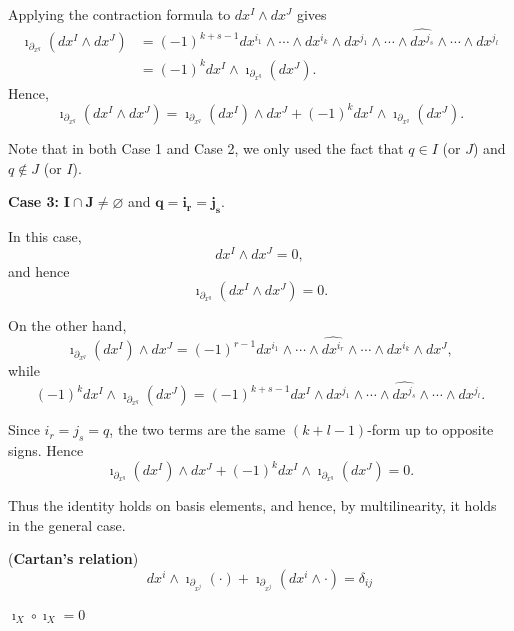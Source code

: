 {Applying the contraction formula to $dx^I\wedge dx^J$ gives
\[
\begin{aligned}
\imath_{\partial_{x^q}}(dx^I\wedge dx^J)
&=
(-1)^{k+s-1}
dx^{i_1}\wedge\cdots\wedge dx^{i_k}
\wedge
dx^{j_1}\wedge\cdots\wedge
\widehat{dx^{j_s}}\wedge\cdots\wedge dx^{j_l}
\\
&=
(-1)^k dx^I\wedge
\imath_{\partial_{x^q}}(dx^J).
\end{aligned}
\]
Hence,
\[
\imath_{\partial_{x^q}}(dx^I\wedge dx^J)
=
\imath_{\partial_{x^q}}(dx^I)\wedge dx^J
+
(-1)^k dx^I\wedge
\imath_{\partial_{x^q}}(dx^J).
\]

\medskip
\noindent
Note that in both Case 1 and Case 2, we only used the fact that
$q\in I$ (or $J$) and $q\notin J$ (or $I$).

\medskip
\noindent
\textbf{Case 3:} $\mathbf{I\cap J\neq\varnothing}$ and
$\mathbf{q=i_r=j_s}$.

In this case,
\[
dx^I\wedge dx^J=0,
\]
and hence
\[
\imath_{\partial_{x^q}}(dx^I\wedge dx^J)=0.
\]

On the other hand,
\[
\imath_{\partial_{x^q}}(dx^I)\wedge dx^J
=
(-1)^{r-1}
dx^{i_1}\wedge\cdots\wedge
\widehat{dx^{i_r}}\wedge\cdots\wedge
dx^{i_k}\wedge dx^J,
\]
while
\[
(-1)^k dx^I\wedge
\imath_{\partial_{x^q}}(dx^J)
=
(-1)^{k+s-1}
dx^I\wedge
dx^{j_1}\wedge\cdots\wedge
\widehat{dx^{j_s}}\wedge\cdots\wedge dx^{j_l}.
\]

Since $i_r=j_s=q$, the two terms are the same $(k+l-1)$-form
up to opposite signs. Hence
\[
\imath_{\partial_{x^q}}(dx^I)\wedge dx^J
+
(-1)^k dx^I\wedge
\imath_{\partial_{x^q}}(dx^J)
=0.
\]

Thus the identity holds on basis elements, and hence, by multilinearity,
it holds in the general case.
}
\begin{corollary} (\textbf{Cartan's relation}) \label{eq:cartan_relation} \begin{equation}dx^i \wedge \imath_{\partial_{x^j}}(\cdot)+\imath_{\partial_{x^j}}(dx^i\wedge \cdot)=\delta_{ij}\end{equation}
    
\end{corollary}

\begin{corollary}
    $\imath_X \circ \imath_X=0$
\end{corollary}

